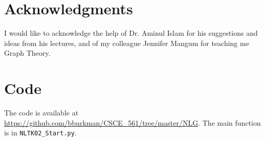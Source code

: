 \documentclass[11pt]{article}
\begin{document}
\section*{Acknowledgments}

I would like to acknowledge the help of Dr. Aminul Islam for his suggestions and ideas from his lectures, and of my colleague Jennifer Mangum for teaching me Graph Theory.  

\appendix
\section*{Code}

The code is available at \url{https://github.com/bburkman/CSCE_561/tree/master/NLG}.  The main function is in \verb|NLTK02_Start.py|.



\end{document}

